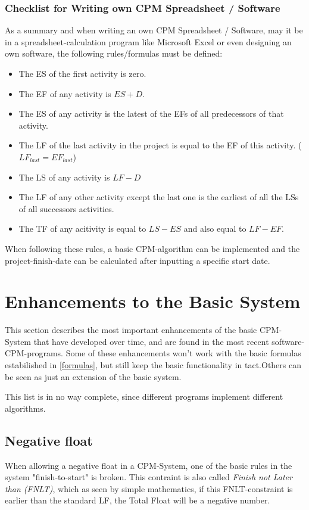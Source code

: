 \subsubsection{Checklist for Writing own CPM Spreadsheet / Software}
As a summary and when writing an own CPM Spreadsheet / Software, may it be in a spreadsheet-calculation program like Microsoft Excel or even designing an own software, the following rules/formulas must be defined:
\begin{itemize}
	\item The ES of the first activity is zero.
	\item The EF of any activity is $ES + D$.
	\item The ES of any activity is the latest of the EFs of all predecessors of that activity.
	\item The LF of the last activity in the project is equal to the EF of this activity. ($LF_{last} = EF_{last}$)
	\item The LS of any activity is $LF - D$
	\item The LF of any other activity except the last one is the earliest of all the LSs of all successors activities.
	\item The TF of any acitivity is equal to $LS - ES$ and also equal to $LF - EF$.
\end{itemize}
When following these rules, a basic CPM-algorithm can be implemented and the project-finish-date can be calculated after inputting a specific start date.













\section{Enhancements to the Basic System}
This section describes the most important enhancements of the basic CPM-System that have developed over time, and are found in the most recent software-CPM-programs. Some of these enhancements won't work with the basic formulas estabilished in \ref{formulas}, but still keep the basic functionality in tact.Others can be seen as just an extension of the basic system.

This list is in no way complete, since different programs implement different algorithms.

\subsection{Negative float}
When allowing a negative float in a CPM-System, one of the basic rules in the system "finish-to-start" is broken. This contraint is also called \textit{Finish not Later than (FNLT)}, which as seen by simple mathematics, if this FNLT-constraint is earlier than the standard LF, the Total Float will be a negative number.

